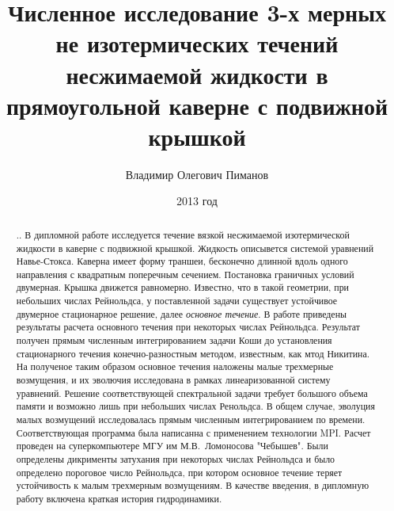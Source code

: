 \documentclass[a4paper,10pt]{article}
\title{Численное исследование 3-х мерных не изотермических течений несжимаемой жидкости в прямоугольной каверне с подвижной крышкой}
\author{Владимир Олегович Пиманов}
\date{2013 год}
\begin{document}

 \maketitle

\begin{abstract}..
  В дипломной работе исследуется течение вязкой несжимаемой изотермической жидкости в каверне с подвижной крышкой. 
  Жидкость описывется системой уравнений Навье-Стокса. Каверна имеет форму траншеи, бесконечно длинной 
  вдоль одного направления с квадратным поперечным сечением. Постановка граничных условий двумерная. 
  Крышка движется равномерно. Известно, что в такой геометрии, при небольших числах Рейнольдса, у поставленной задачи
  существует устойчивое двумерное стационарное решение, далее \textit{основное течение}. В работе приведены результаты
  расчета основного течения при некоторых числах Рейнольдса. Результат получен прямым численным интегрированием задачи 
  Коши до установления стационарного течения конечно-разностным методом, известным, как мтод Никитина. 
  На полученое таким образом основное течения наложены малые 
  трехмерные возмущения, и их эволючия исследована в рамках линеаризованной систему уравнений. Решение 
  соответствующей спектральной задачи требует большого объема памяти и возможно лишь при небольших числах Ренольдса.
  В общем случае, эволуция малых возмущений исследовалась прямым численным интегрированием по времени. 
  Соответствующая программа была написанна с применением технологии MPI. Расчет проведен на суперкомпьютере 
  МГУ им М.В.~Ломоносова "Чебышев". Были определены дикрименты затухания при некоторых числах Рейнольдса и было 
  определено пороговое число Рейнольдса, при котором основное течение теряет устойчивость к малым трехмерным возмущениям. 
  В качестве введения, в дипломную работу включена краткая история гидродинамики.
\end{abstract}
\newpage  

  
  
%  
  
  
%  
  
  
\end{document}
